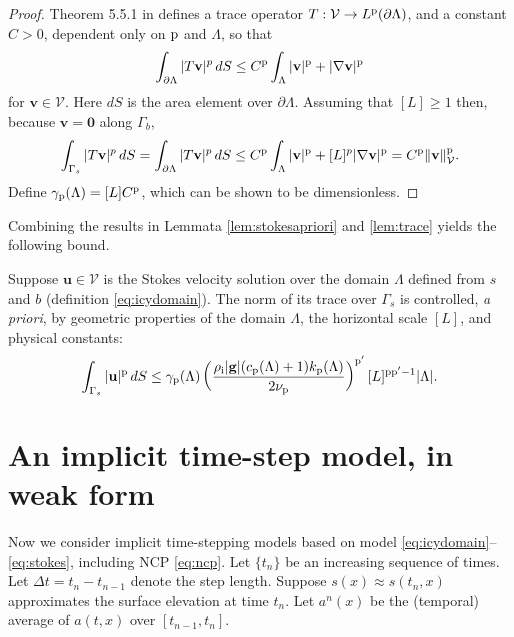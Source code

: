 \documentclass[hidelinks,onefignum,onetabnum,final]{siamart220329}  %
\newcommand{\grad}{\nabla}
\newcommand{\bg}{\mathbf{g}}
\newcommand{\bu}{\mathbf{u}}
\newcommand{\bv}{\mathbf{v}}
\newcommand{\bzero}{\bm{0}}
\newcommand{\cV}{\mathcal{V}}
\newcommand{\pp}{{\text{\textnormal{p}}}}
\newcommand{\rhoi}{\rho_{\text{i}}}
\begin{document}
\begin{proof}
Theorem 5.5.1 in \cite{Evans2010} defines a trace operator $T:\cV\to L^\pp(\partial\Lambda)$, and a constant $C>0$, dependent only on $\pp$ and $\Lambda$, so that
\begin{equation}
\int_{\partial\Lambda} |T\bv|^p\,dS \le C^\pp \int_{\Lambda} |\bv|^\pp + |\grad\bv|^\pp \label{eq:tracework}
\end{equation}
for $\bv\in\cV$.  Here $dS$ is the area element over $\partial\Lambda$.  Assuming that $[L] \ge 1$ then, because $\bv=\bzero$ along $\Gamma_b$,
\begin{equation}
\int_{\Gamma_s} |T\bv|^p\,dS = \int_{\partial\Lambda} |T\bv|^p\,dS \le C^\pp \int_{\Lambda} |\bv|^\pp + [L]^p |\grad\bv|^\pp = C^\pp \|\bv\|_{\cV}^\pp. \label{eq:traceworktwo}
\end{equation}
Define $\gamma_{\pp}(\Lambda)=[L] C^\pp$, which can be shown to be dimensionless.
\end{proof}

Combining the results in Lemmata \ref{lem:stokesapriori} and \ref{lem:trace} yields the following bound.

\begin{corollary} \label{cor:surfacetracebound}
Suppose $\bu\in\cV$ is the Stokes velocity solution over the domain $\Lambda$ defined from $s$ and $b$ (definition \eqref{eq:icydomain}).  The norm of its trace over $\Gamma_s$ is controlled, \emph{a priori}, by geometric properties of the domain $\Lambda$, the horizontal scale $[L]$, and physical constants:
\begin{equation}
\int_{\Gamma_s} |\bu|^\pp \,dS \le \gamma_{\pp}(\Lambda) \left(\frac{\rhoi |\bg| (c_{\pp}(\Lambda) + 1) k_{\pp}(\Lambda)}{2 \nu_\pp}\right)^{\pp'} [L]^{\pp\pp'-1} |\Lambda|. \label{eq:surfacetracebound}
\end{equation}
\end{corollary}


\section{An implicit time-step model, in weak form} \label{sec:model}

Now we consider implicit time-stepping models based on model \eqref{eq:icydomain}--\eqref{eq:stokes}, including NCP \eqref{eq:ncp}.  Let $\{t_n\}$ be an increasing sequence of times.  Let $\Delta t = t_n-t_{n-1}$ denote the step length.  Suppose $s(x)\approx s(t_n,x)$ approximates the surface elevation at time $t_n$.  Let $a^n(x)$ be the (temporal) average of $a(t,x)$ over $[t_{n-1},t_n]$.
\end{document}
